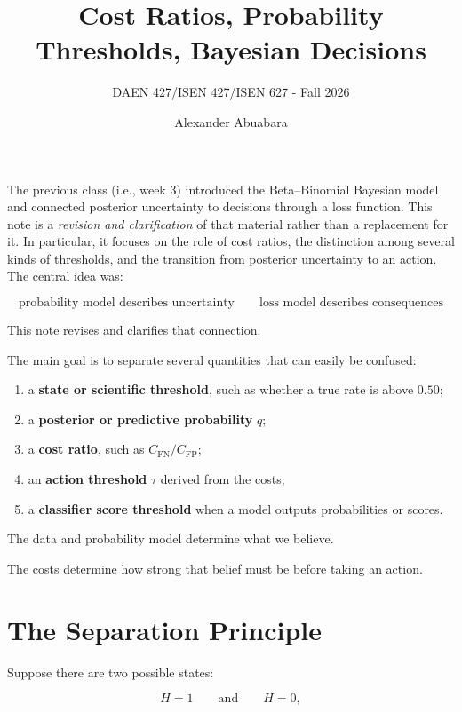 \documentclass[11pt]{article}
\title{Cost Ratios, Probability Thresholds, Bayesian Decisions}
\author{DAEN 427/ISEN 427/ISEN 627 - Fall 2026}
\date{Alexander Abuabara}
\newcommand{\CFP}{C_{\mathrm{FP}}}
\newcommand{\CFN}{C_{\mathrm{FN}}}
\begin{document}
\maketitle


The previous class (i.e., week 3) introduced the Beta--Binomial Bayesian model and connected posterior uncertainty to decisions through a loss function. This note is a \emph{revision and clarification} of that material rather than a replacement for it. In particular, it focuses on the role of cost ratios, the distinction among several kinds of thresholds, and the transition from posterior uncertainty to an action. The central idea was:

\[
\boxed{
\text{probability model describes uncertainty}
\qquad
\text{loss model describes consequences}
}
\]

This note revises and clarifies that connection.

The main goal is to separate several quantities that can easily be confused:

\begin{enumerate}[label=\arabic*.]
    \item a \textbf{state or scientific threshold}, such as whether a true rate is above $0.50$;
    \item a \textbf{posterior or predictive probability} $q$;
    \item a \textbf{cost ratio}, such as $\CFN/\CFP$;
    \item an \textbf{action threshold} $\tau$ derived from the costs;
    \item a \textbf{classifier score threshold} when a model outputs probabilities or scores.
\end{enumerate}

The data and probability model determine what we believe.

The costs determine how strong that belief must be before taking an action.

\section{The Separation Principle}

Suppose there are two possible states:

\[
H=1
\qquad\text{and}\qquad
H=0,
\]
\end{document}
